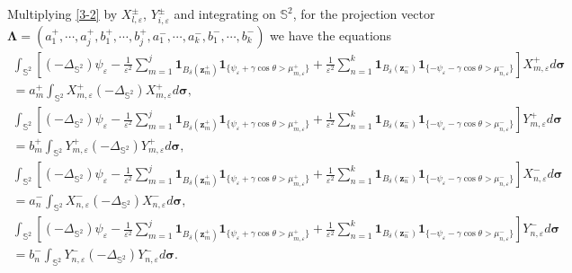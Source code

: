 \documentclass[12pt,reqno]{amsart}
\numberwithin{equation}{section}
\theoremstyle{definition}
\theoremstyle{remark}
\begin{document}
	Multiplying \eqref{3-2} by $X_{l,\varepsilon}^\pm$, $Y_{i,\varepsilon}^\pm$ and integrating on $\mathbb S^2$, for the projection vector $\boldsymbol \Lambda=(a_1^+,\cdots,a_j^+,b_1^+,\cdots,b_j^+, a_1^-,\cdots,a_k^-,b_1^-,\cdots,b_k^-)$ we have the equations
	\begin{align*}
		\int_{\mathbb S^2}\left[(-\Delta_{\mathbb S^2})\psi_\varepsilon-\frac{1}{\varepsilon^2}\sum_{m=1}^j\boldsymbol1_{B_\delta(\boldsymbol z_m^+)}\boldsymbol1_{\{\psi_\varepsilon+\gamma\cos\theta>\mu_{m,\varepsilon}^+\}}+\frac{1}{\varepsilon^2}\sum_{n=1}^k\boldsymbol1_{B_\delta(\boldsymbol z_n^-)}\boldsymbol1_{\{-\psi_\varepsilon-\gamma\cos\theta>\mu_{n,\varepsilon}^-\}}\right]X_{m,\varepsilon}^+ d\boldsymbol\sigma\\
		=a_m^+\int_{\mathbb S^2} X_{m,\varepsilon}^+(-\Delta_{\mathbb S^2})X_{m,\varepsilon}^+ d\boldsymbol \sigma,
	\end{align*}
	\begin{align*}
		\int_{\mathbb S^2}\left[(-\Delta_{\mathbb S^2})\psi_\varepsilon-\frac{1}{\varepsilon^2}\sum_{m=1}^j\boldsymbol1_{B_\delta(\boldsymbol z_m^+)}\boldsymbol1_{\{\psi_\varepsilon+\gamma\cos\theta>\mu_{m,\varepsilon}^+\}}+\frac{1}{\varepsilon^2}\sum_{n=1}^k\boldsymbol1_{B_\delta(\boldsymbol z_n^-)}\boldsymbol1_{\{-\psi_\varepsilon-\gamma\cos\theta>\mu_{n,\varepsilon}^-\}}\right]Y_{m,\varepsilon}^+ d\boldsymbol\sigma\\
		=b_m^+\int_{\mathbb S^2} Y_{m,\varepsilon}^+(-\Delta_{\mathbb S^2})Y_{m,\varepsilon}^+ d\boldsymbol \sigma,
	\end{align*}
	\begin{align*}
		\int_{\mathbb S^2}\left[(-\Delta_{\mathbb S^2})\psi_\varepsilon-\frac{1}{\varepsilon^2}\sum_{m=1}^j\boldsymbol1_{B_\delta(\boldsymbol z_m^+)}\boldsymbol1_{\{\psi_\varepsilon+\gamma\cos\theta>\mu_{m,\varepsilon}^+\}}+\frac{1}{\varepsilon^2}\sum_{n=1}^k\boldsymbol1_{B_\delta(\boldsymbol z_n^-)}\boldsymbol1_{\{-\psi_\varepsilon-\gamma\cos\theta>\mu_{n,\varepsilon}^-\}}\right]X_{n,\varepsilon}^- d\boldsymbol\sigma\\
		=a_n^-\int_{\mathbb S^2} X_{n,\varepsilon}^-(-\Delta_{\mathbb S^2})X_{n,\varepsilon}^- d\boldsymbol \sigma,
	\end{align*}
	\begin{align*}
		\int_{\mathbb S^2}\left[(-\Delta_{\mathbb S^2})\psi_\varepsilon-\frac{1}{\varepsilon^2}\sum_{m=1}^j\boldsymbol1_{B_\delta(\boldsymbol z_m^+)}\boldsymbol1_{\{\psi_\varepsilon+\gamma\cos\theta>\mu_{m,\varepsilon}^+\}}+\frac{1}{\varepsilon^2}\sum_{n=1}^k\boldsymbol1_{B_\delta(\boldsymbol z_n^-)}\boldsymbol1_{\{-\psi_\varepsilon-\gamma\cos\theta>\mu_{n,\varepsilon}^-\}}\right]Y_{n,\varepsilon}^- d\boldsymbol\sigma\\
		=b_n^-\int_{\mathbb S^2} Y_{n,\varepsilon}^-(-\Delta_{\mathbb S^2})Y_{n,\varepsilon}^- d\boldsymbol \sigma.
	\end{align*}
\end{document}
